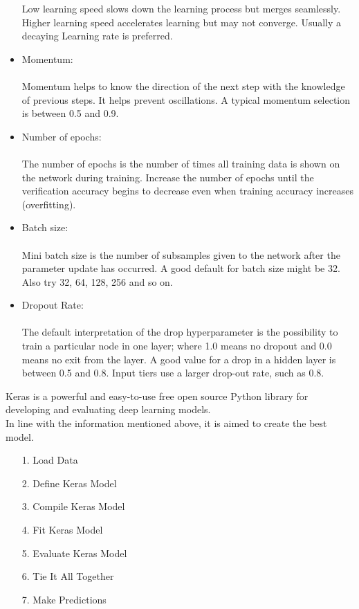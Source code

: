 \documentclass[a4paper, 12pt]{article}
\begin{document}
\begin{itemize}
Low learning speed slows down the learning process but merges seamlessly. Higher learning speed accelerates learning but may not converge.
Usually a decaying Learning rate is preferred.\\
\item Momentum:\\ \\
Momentum helps to know the direction of the next step with the knowledge of previous steps. It helps prevent oscillations. A typical momentum selection is between 0.5 and 0.9.\\
\item Number of epochs:\\ \\
The number of epochs is the number of times all training data is shown on the network during training.
Increase the number of epochs until the verification accuracy begins to decrease even when training accuracy increases (overfitting).\\
\item Batch size:\\ \\
Mini batch size is the number of subsamples given to the network after the parameter update has occurred.
A good default for batch size might be 32. Also try 32, 64, 128, 256 and so on.\\
\item Dropout Rate:
\\ \\ The default interpretation of the drop hyperparameter is the possibility to train a particular node in one layer; where 1.0 means no dropout and 0.0 means no exit from the layer.
A good value for a drop in a hidden layer is between 0.5 and 0.8. Input tiers use a larger drop-out rate, such as 0.8.\\
\end{itemize}
Keras is a powerful and easy-to-use free open source Python library for developing and evaluating deep learning models.  \\ In line with the information mentioned above, it is aimed to create the best model.
\begin{enumerate}
\item[1.] Load Data
\item[2.] Define Keras Model
\item[3.] Compile Keras Model
\item[4.] Fit Keras Model
\item[5.] Evaluate Keras Model
\item[6.] Tie It All Together
\item[7.] Make Predictions
\end{enumerate}
\end{document}
